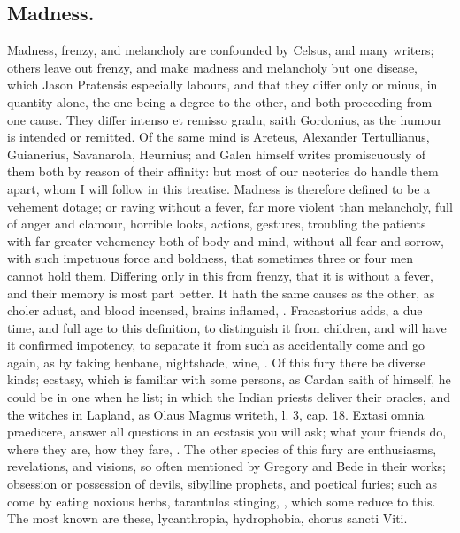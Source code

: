 {\subsection{Madness.}
Madness, frenzy, and melancholy are confounded by Celsus,
and many writers; others leave out frenzy, and make madness and
melancholy but one disease, which Jason Pratensis especially
labours, and that they differ only  or minus, in quantity
alone, the one being a degree to the other, and both proceeding from
one cause. They differ intenso et remisso gradu, saith Gordonius,
as the humour is intended or remitted. Of the same mind is
Areteus, Alexander Tertullianus, Guianerius, Savanarola, Heurnius;
and Galen himself writes promiscuously of them both by reason of their
affinity: but most of our neoterics do handle them apart, whom I will
follow in this treatise. Madness is therefore defined to be a vehement
dotage; or raving without a fever, far more violent than melancholy,
full of anger and clamour, horrible looks, actions, gestures, troubling
the patients with far greater vehemency both of body and mind, without
all fear and sorrow, with such impetuous force and boldness, that
sometimes three or four men cannot hold them. Differing only in this
from frenzy, that it is without a fever, and their memory is most part
better. It hath the same causes as the other, as choler adust, and
blood incensed, brains inflamed, \etc{}. Fracastorius adds, a due
time, and full age to this definition, to distinguish it from children,
and will have it confirmed impotency, to separate it from such as
accidentally come and go again, as by taking henbane, nightshade, wine,
\etc{}. Of this fury there be diverse kinds; ecstasy, which is familiar
with some persons, as Cardan saith of himself, he could be in one when
he list; in which the Indian priests deliver their oracles, and the
witches in Lapland, as Olaus Magnus writeth, \textlatin{l. 3, cap. 18. Extasi
omnia praedicere}, answer all questions in an ecstasis you will ask;
what your friends do, where they are, how they fare, \etc{}. The other
species of this fury are enthusiasms, revelations, and visions, so
often mentioned by Gregory and Bede in their works; obsession or
possession of devils, sibylline prophets, and poetical furies; such as
come by eating noxious herbs, tarantulas stinging, \etc{}, which some
reduce to this. The most known are these, lycanthropia, hydrophobia,
\textlatin{chorus sancti Viti}.

}

